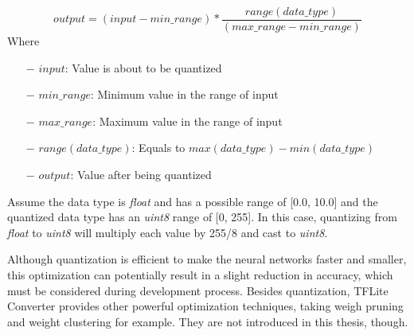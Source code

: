 \begin{equation}
    output = (input - min\_range) * \frac{range(data\_type)}{(max\_range - min\_range)}
\end{equation}
Where \begin{itemize}
    \item [$-$] $input$: Value is about to be quantized
    \item [$-$] $min\_range$: Minimum value in the range of input
    \item [$-$] $max\_range$: Maximum value in the range of input
    \item [$-$] $range(data\_type)$: Equals to $max(data\_type) - min(data\_type)$
    \item [$-$] $output$: Value after being quantized
\end{itemize} 

Assume the data type is \emph{float} and has a possible range of [0.0, 10.0] and the quantized data type has an \emph{uint8} range of [0, 255]. In this case, quantizing from \emph{float} to \emph{uint8} will multiply each value by 255/8 and cast to \emph{uint8}. \par

Although quantization is efficient to make the neural networks faster and smaller, this optimization can potentially result in a slight reduction in accuracy, which must be considered during development process. Besides quantization, TFLite Converter provides other powerful optimization techniques, taking weigh pruning and weight clustering for example. They are not introduced in this thesis, though. \par

